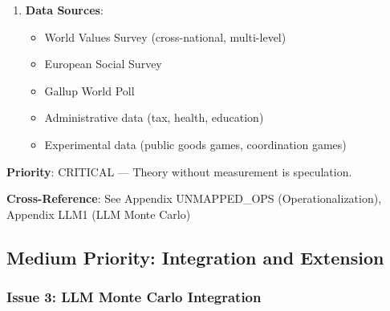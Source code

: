 \begin{tcolorbox}[colback=red!5!white, colframe=red!75!black, title=Status: Incomplete]
\begin{enumerate}
\item \textbf{Data Sources}:
    \begin{itemize}[nosep]
    \item World Values Survey (cross-national, multi-level)
    \item European Social Survey
    \item Gallup World Poll
    \item Administrative data (tax, health, education)
    \item Experimental data (public goods games, coordination games)
    \end{itemize}
\end{enumerate}

\textbf{Priority}: \colorbox{red!20}{CRITICAL} --- Theory without measurement is speculation.

\textbf{Cross-Reference}: See Appendix UNMAPPED_OPS (Operationalization), Appendix LLM1 (LLM Monte Carlo)
\end{tcolorbox}

\subsection{Medium Priority: Integration and Extension}

\subsubsection{Issue 3: LLM Monte Carlo Integration}

